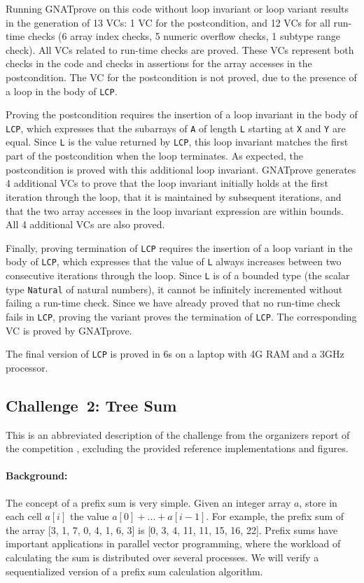 \documentclass[sttt,final]{svjour}
\newcommand{\gnatprove}{GNATprove\xspace}
\begin{document}
Running \gnatprove on this code without loop invariant or loop variant results
in the generation of 13 VCs: 1 VC for the postcondition, and 12 VCs for all
run-time checks (6 array index checks, 5 numeric overflow checks, 1 subtype
range check). All VCs related to run-time checks are proved. These VCs
represent both checks in the code and checks in assertions for the array
accesses in the postcondition. The VC for the postcondition is not proved, due
to the presence of a loop in the body of \verb|LCP|.

Proving the postcondition requires the insertion of a loop invariant in the
body of \verb|LCP|, which expresses that the subarrays of \verb|A| of length
\verb|L| starting at \verb|X| and \verb|Y| are equal. Since \verb|L| is the
value returned by \verb|LCP|, this loop invariant matches the first part of the
postcondition when the loop terminates. As expected, the postcondition is
proved with this additional loop invariant. \gnatprove generates 4 additional
VCs to prove that the loop invariant initially holds at the first iteration
through the loop, that it is maintained by subsequent iterations, and that the
two array accesses in the loop invariant expression are within bounds. All 4
additional VCs are also proved.

Finally, proving termination of \verb|LCP| requires the insertion of a loop
variant in the body of \verb|LCP|, which expresses that the value of \verb|L|
always increases between two consecutive iterations through the loop. Since
\verb|L| is of a bounded type (the scalar type \verb|Natural| of natural
numbers), it cannot be infinitely incremented without failing a run-time
check. Since we have already proved that no run-time check fails in \verb|LCP|,
proving the variant proves the termination of \verb|LCP|. The corresponding VC
is proved by \gnatprove.

The final version of \verb|LCP| is proved in 6s on a laptop with 4G
RAM and a 3GHz processor.

\subsection{Challenge~2: Tree Sum}
This is an abbreviated description of the challenge from the
organizers report of the competition \cite {verifythis2012}, excluding
the provided reference implementations and figures.
%
\paragraph{Background:}
The concept of a prefix sum is very simple. Given an integer array
$a$, store in each cell $a[i]$ the value $a[0] + \ldots + a[i-1]$.
For example, the prefix sum of the array [3, 1, 7, 0, 4, 1, 6, 3] is
[0, 3, 4, 11, 11, 15, 16, 22].
%
Prefix sums have important applications in parallel vector
programming, where the workload of calculating the sum is distributed
over several processes. We will verify a sequentialized version of a
prefix sum calculation algorithm.
%
\end{document}
